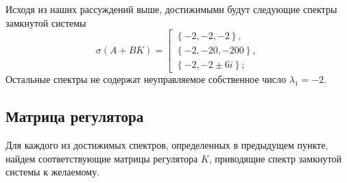 \documentclass[a4paper, 12pt]{article}
\begin{document}
    Исходя из наших рассуждений выше, достижимыми будут следующие спектры замкнутой системы
    $$
    \sigma\left(A+BK\right)= 
    \left[ 
      \begin{gathered} 
        \left\{-2,-2,-2\right\}, \\ 
        \left\{-2,-20,-200\right\},\\
        \left\{-2,-2\pm6i\right\};
      \end{gathered} 
\right.
    $$
    Остальные спектры не содержат неуправляемое собственное число $\lambda_1=-2$.


    \subsection{Матрица регулятора}
    Для каждого из достижимых спектров, определенных в предыдущем пункте, найдем
    соответствующие матрицы регулятора $K$, приводящие спектр замкнутой системы
    к желаемому.
\end{document}
